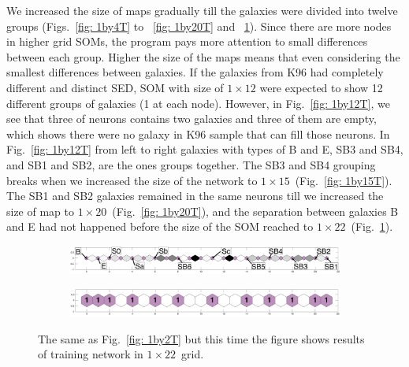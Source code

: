\documentclass[useAMS,usenatbib]{mn2e}
\begin{document}
            We increased the size of maps gradually till the galaxies were divided into twelve groups (Figs.~\ref{fig: 1by4T} to ~\ref{fig: 1by20T} and ~\ref{fig: 1by22T}).
            Since there are more nodes in higher grid SOMs, the program pays more attention to small differences between each group.
            Higher the size of the maps means that even considering the smallest differences between galaxies.
            If the galaxies from K96 had completely different and distinct SED, SOM with size of $1\times12$ were expected to show 12 different groups of galaxies (1 at each node).
            However, in Fig.~\ref{fig: 1by12T}, we see that three of neurons contains two galaxies and three of them are empty, which shows there were no galaxy in K96 sample that can fill those neurons.
            In Fig.~\ref{fig: 1by12T} from left to right galaxies with types of B and E, SB3 and SB4, and SB1 and SB2, are the ones groups together. 
            The SB3 and SB4 grouping breaks when we increased the size of the network to $1\times15$~(Fig.~\ref{fig: 1by15T}).
            The SB1 and SB2 galaxies remained in the same neurons till we increased the size of map to $1\times20$~(Fig.~\ref{fig: 1by20T}), and the separation between galaxies B and E had not happened before the size of the SOM reached to $1\times22$~(Fig.~\ref{fig: 1by22T}).
        \begin{figure}
            \begin{subfigure}[b]{\textwidth}
                \centering
                \includegraphics[width=\textwidth]{images0.01/1d/dist_1_by_22.png}
            \end{subfigure}
            \hfill
            \begin{subfigure}[b]{\textwidth}
                \includegraphics[width=\textwidth]{images0.01/1d/hit_t_1_by_22.png}
            \end{subfigure}
            \caption{The same as Fig.~\ref{fig: 1by2T} but this time the figure shows results of training network in $1\times22$~grid.}
            \label{fig: 1by22T}
        \end{figure} %
    
\end{document}

